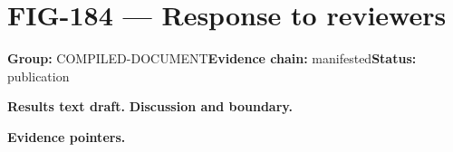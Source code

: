 \clearpage
\section{FIG-184 --- Response to reviewers}
\label{figpage:fig-184}
\textbf{Group:} COMPILED-DOCUMENT\quad \textbf{Evidence chain:} manifested\quad \textbf{Status:} publication

\textbf{Results text draft.} 
\textbf{Discussion and boundary.} 


\textbf{Evidence pointers.}



\vfill
